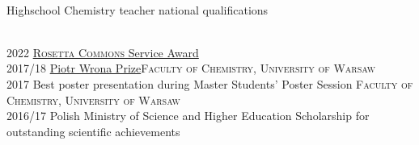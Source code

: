 \documentclass[verylight]{simplehipstercv}
\begin{document}
\begin{paracol}{2}
{\\[0.5em]
{Highschool Chemistry teacher national qualifications}
\vspace{3mm }


\\[0.5em]
    2022 \href{https://www.rosettacommons.org/about/rosetta-service-award}{\textsc{Rosetta Commons} Service Award}\vspace{0.5em}\\
    2017/18 \href{http://www.chem.uw.edu.pl/en/awards/piotr-wrona-prize/}{Piotr Wrona Prize}\newline \textsc{Faculty of Chemistry, University of Warsaw}\vspace{0.5em}\\
    2017  Best poster presentation during Master Students' Poster Session \textsc{Faculty of Chemistry, University of Warsaw\vspace{0.5em}}\\
    2016/17 Polish Ministry of Science and Higher Education Scholarship for outstanding scientific achievements

}
\end{paracol}
\end{document}
